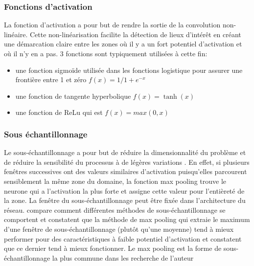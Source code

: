     \subsubsection{Fonctions d'activation}\label{sssection:activ_fn}
    La fonction d'activation a pour but de rendre la sortie de la convolution non-linéaire. Cette non-linéarisation facilite la détection de lieux d'intérêt en créant une démarcation claire entre les zones où il y a un fort potentiel d'activation et où il n'y en a pas. 3 fonctions sont typiquement utilisées à cette fin: 
      \begin{itemize}
        \item une fonction sigmoïde utilisée dans les fonctions logistique pour assurer une frontière entre 1 et zéro $f(x) = 1/1+ e^{-x} $
        \item une fonction de tangente hyperbolique $f(x) = \tanh(x) $ 
        \item une fonction de \ac{ReLu} qui est $f(x)  = max(0,x) $
      \end{itemize}
    \subsubsection{Sous échantillonnage}
    Le sous-échantillonnage a pour but de réduire la dimensionnalité du problème et de réduire la sensibilité du processus à de légères variations \parencite{lecun_convolutional_1995}. En effet, si plusieurs fenêtres successives ont des valeurs similaires d'activation puisqu'elles parcourent sensiblement la même zone du domaine, la fonction max pooling trouve le neurone qui a l'activation la plus forte et assigne cette valeur pour l'entièreté de la zone. La fenêtre du sous-échantillonnage peut être fixée dans l'architecture du réseau. \textcite{boureau_theoretical_2010} compare comment différentes méthodes de sous-échantillonnage se comportent et constatent que la méthode de max pooling qui extraie le maximum d'une fenêtre de sous-échantillonnage (plutôt qu'une moyenne) tend à mieux performer pour des caractéristiques à faible potentiel d'activation et constatent que ce dernier tend à mieux fonctionner. Le max pooling est la forme de sous-échantillonnage la plus commune dans les recherche de l'auteur \parencite{ronneberger_u-net_2015, he_deep_2016}
